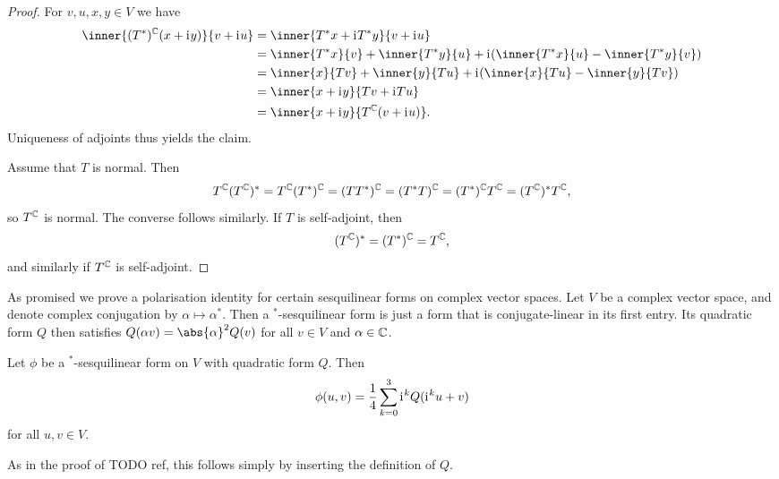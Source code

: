 \begin{proof}
    For $v,u,x,y \in V$ we have
    \begin{align*}
        \inner{(T^*)^\complex(x + \iu y)}{v + \iu u}
            &= \inner{ T^*x + \iu T^*y }{v + \iu u} \\
            &= \inner{T^*x}{v}
                + \inner{T^*y}{u}
                + \iu ( \inner{T^*x}{u} - \inner{T^*y}{v} ) \\
            &= \inner{x}{Tv}
                + \inner{y}{Tu}
                + \iu ( \inner{x}{Tu} - \inner{y}{Tv} ) \\
            &= \inner{x + \iu y}{Tv + \iu Tu} \\
            &= \inner{x + \iu y}{T^\complex(v + \iu u)}.
    \end{align*}
    Uniqueness of adjoints thus yields the claim.

    Assume that $T$ is normal. Then
    \begin{equation*}
        T^{\mathbb{C}} (T^{\mathbb{C}})^*
            = T^{\mathbb{C}} (T^*)^{\mathbb{C}}
            = (TT^*)^{\mathbb{C}}
            = (T^*T)^{\mathbb{C}}
            = (T^*)^{\mathbb{C}} T^{\mathbb{C}}
            = (T^{\mathbb{C}})^* T^{\mathbb{C}},
    \end{equation*}
    so $T^{\mathbb{C}}$ is normal. The converse follows similarly. If $T$ is self-adjoint, then
    \begin{equation*}
        (T^{\mathbb{C}})^*
            = (T^*)^{\mathbb{C}}
            = T^{\mathbb{C}},
    \end{equation*}
    and similarly if $T^{\mathbb{C}}$ is self-adjoint.
\end{proof}


As promised we prove a polarisation identity for certain sesquilinear forms on complex vector spaces. Let $V$ be a complex vector space, and denote complex conjugation by $\alpha \mapsto \alpha^*$. Then a ${}^*$-sesquilinear form is just a form that is conjugate-linear in its first entry. Its quadratic form $Q$ then satisfies $Q(\alpha v) = \abs{\alpha}^2 Q(v)$ for all $v \in V$ and $\alpha \in \mathbb{C}$.

\begin{propositionnoproof}
    Let $\phi$ be a ${}^*$-sesquilinear form on $V$ with quadratic form $Q$. Then
    \begin{equation*}
        \phi(u,v)
            = \frac{1}{4} \sum_{k=0}^3 \iu^k Q(\iu^k u + v)
    \end{equation*}
    for all $u,v \in V$.
\end{propositionnoproof}
%
As in the proof of TODO ref, this follows simply by inserting the definition of $Q$.

